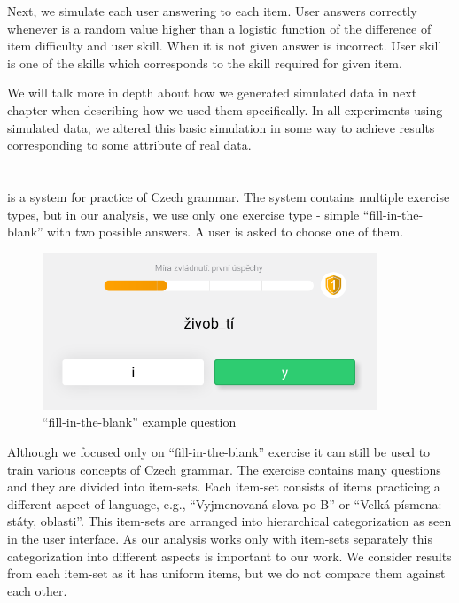 \documentclass[
  digital, %
  table,   %
  nolof,     %
  nolot,     %
  nocover
]{fithesis3}
\begin{document}
Next, we simulate each user answering to each item. User answers correctly whenever is a random value higher than a logistic function of the difference of item difficulty and user skill. When it is not given answer is incorrect. User skill is one of the skills which corresponds to the skill required for given item.

We will talk more in depth about how we generated simulated data in next chapter when describing how we used them specifically. In all experiments using simulated data, we altered this basic simulation in some way to achieve results corresponding to some attribute of real data.


\section{\umimeCesky{}}\label{umime-cesky}


\href{https://umimecesky.cz/}{\umimeCesky{}} is a system for practice of Czech grammar. The system contains multiple exercise types, but in our analysis, we use only one exercise type - simple ``fill-in-the-blank'' with two possible answers. A user is asked to choose one of them.

\begin{figure}
  \includegraphics[width=10cm]{img/umimecesky_doplnovacka}
  \caption{``fill-in-the-blank'' example question}
  \label{fig:umimeceskydoplnovacka}
\end{figure}

Although we focused only on ``fill-in-the-blank'' exercise it can still be used to train various concepts of Czech grammar. The exercise contains many questions and they are divided into item-sets. Each item-set consists of items practicing a different aspect of language, e.g., ``Vyjmenovaná slova po B'' or ``Velká písmena: státy, oblasti''. This item-sets are arranged into hierarchical categorization as seen in the user interface. As our analysis works only with item-sets separately this categorization into different aspects is important to our work. We consider results from each item-set as it has uniform items, but we do not compare them against each other.
\end{document}
